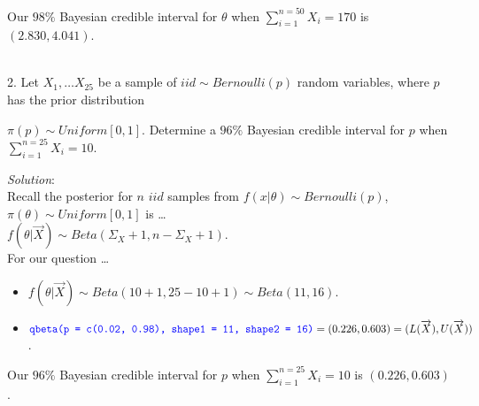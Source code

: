 \documentclass[12pt]{article}
\newcommand{\XB}{\color{black}}
\newcommand{\XBB}{\color{blue}}
\newcommand{\ds}{\displaystyle}
\begin{document}
\noindent
Our $ 98\% $ Bayesian credible interval for $ \theta $ when $ \ds \sum_{i=1}^{n=50} X_{i} = 170 $ is $ (2.830, 4.041) $. \\

\vspace{2.5mm}

\newpage
\XBB\hrulefill\XB \\

2. Let $ \ds X_{1}, \dots X_{25} $ be a sample of $ iid \sim Bernoulli(p) $ random variables,
where $ p $ has the prior distribution 

$ \pi(p) \sim Uniform[0,1] $. 
Determine a $ 96\% $ Bayesian credible interval for $ p $ when $ \ds \sum_{i=1}^{n=25} X_{i} = 10 $. \\ 

\XBB\hrulefill\XB 
\vspace{5mm} 

\vspace{2.5mm} 
\textit{Solution}:
\vspace{2.5mm} \\

\noindent
Recall the posterior for $ n $ $ iid $ samples from $ f(x | \theta) \sim Bernoulli(p) $, $ \pi(\theta) \sim Uniform[0,1] $ is \dots \\ 

$ \ds f(\theta | \overrightarrow{X}) \sim Beta( \Sigma_{X} + 1, n - \Sigma_{X} + 1 ) $. \\

\noindent
For our question \dots

\begin{itemize}
    \item $ \ds f(\theta | \overrightarrow{X}) \sim Beta( 10 + 1, 25 - 10 + 1 ) \sim Beta( 11, 16 ) $.
    \item $ \ds {\XBB \texttt{qbeta(p = c(0.02, 0.98), shape1 = 11, shape2 = 16)}} = (0.226, 0.603) = (L(\overrightarrow{X}),U(\overrightarrow{X})) $.
\end{itemize}

\noindent
Our $ 96\% $ Bayesian credible interval for $ p $ when $ \ds \sum_{i=1}^{n=25} X_{i} = 10 $ is $ (0.226, 0.603) $. \\

\vspace{2.5mm}
\end{document}
